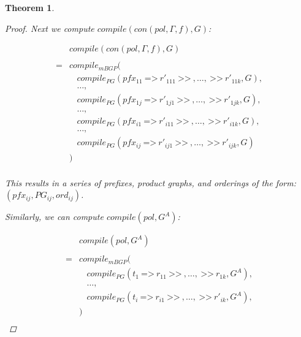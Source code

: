 \documentclass[twocolumn, openany]{sig-alternate-10pt}
\newcommand{\Prefer}{\texttt{>>}}
\newcommand{\Path}{\texttt{=>}}
\newtheorem{thm}{Theorem}
\begin{document}
\begin{thm}
\begin{proof}
    Next we compute $compile(con(pol,\Gamma,f), G)$:

    \[ \begin{array}{ll}
        & compile(con(pol,\Gamma,f), G)  \\
                          & \\
                         =& compile_{mBGP}( \\
                          &  ~~~~ compile_{PG}(pfx_{11} ~\Path~ r'_{111} ~\Prefer~,\dots, ~\Prefer~ r'_{11k},G ), \\
                          &  ~~~~ \dots, \\
                          &  ~~~~ compile_{PG}(pfx_{1j} ~\Path~ r'_{1j1} ~\Prefer~,\dots, ~\Prefer~ r'_{1jk},G ), \\
                          &  ~~~~ \dots, \\
                          &  ~~~~ compile_{PG}(pfx_{i1} ~\Path~ r'_{i11} ~\Prefer~,\dots, ~\Prefer~ r'_{i1k},G ), \\
                          &  ~~~~ \dots, \\
                          &  ~~~~ compile_{PG}(pfx_{ij} ~\Path~ r'_{ij1} ~\Prefer~,\dots, ~\Prefer~ r'_{ijk},G ) \\
                          &  ) \\
    \end{array} \]
 
    \vspace{.5em}
    This results in a series of prefixes, product graphs, and orderings of the form: $(pfx_{ij}, PG_{ij}, ord_{ij})$.

    \vspace{1em}
    Similarly, we can compute $compile(pol, G^A)$:

    \[ \begin{array}{ll}
        & compile(pol,G^A)  \\
                      & \\
                     =& compile_{mBGP}( \\
                      & ~~~~ compile_{PG}(t_1 ~\Path~ r_{11} ~\Prefer~,\dots, ~\Prefer~ r_{1k}, G^A ), \\
                      & ~~~~ \dots, \\
                      & ~~~~ compile_{PG}(t_i ~\Path~ r_{i1} ~\Prefer~,\dots, ~\Prefer~ r'_{ik}, G^A ), \\
                      & ) \\
    \end{array} \]


\end{proof}
\end{thm}
\end{document}
